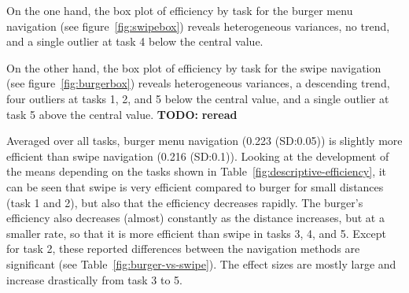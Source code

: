 \documentclass{sig-alternate-05-2015}
\newcommand{\todo}{\textbf{TODO:} \textbf}
\begin{document}
On the one hand, the box plot of efficiency by task for the burger menu navigation
(see figure~\ref{fig:swipebox}) reveals heterogeneous variances,
no trend, and a single outlier at task 4 below the central value.

On the other hand, the box plot of efficiency by task for the swipe navigation
(see figure~\ref{fig:burgerbox}) reveals heterogeneous variances,
a descending trend, four outliers at tasks 1, 2, and 5 below the central value,
and a single outlier at task 5 above the central value.
\todo{reread}

Averaged over all tasks, burger menu navigation (0.223 (SD:\@0.05)) is slightly more efficient than swipe navigation (0.216 (SD:\@0.1)). Looking at the
development of the means depending on the tasks shown in Table~\ref{fig:descriptive-efficiency}, it can be seen that swipe is very efficient compared to burger for small distances (task 1 and 2), 
but also that the efficiency decreases rapidly. The burger's efficiency also decreases (almost) constantly as the distance increases, but at a smaller rate, so that it is more efficient than swipe
in tasks 3, 4, and 5. Except for task 2, these reported differences between the navigation methods are significant (see Table~\ref{fig:burger-vs-swipe}). The effect sizes are mostly large and
increase drastically from task 3 to 5.
\begin{table}[!h]
\centering
\caption{Mean (standard deviation) of efficiency}
\label{fig:descriptive-efficiency}
\end{table}
\end{document}

